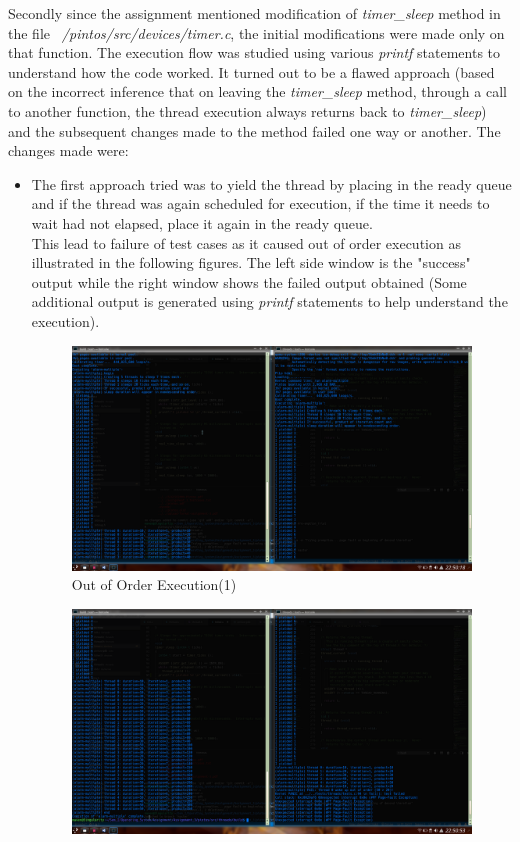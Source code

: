 \documentclass[]{article}
\begin{document}
		Secondly since the assignment mentioned modification of \textit{timer\_sleep} method in the file \textit{~/pintos/src/devices/timer.c}, the initial modifications were made only on that function. The execution flow was studied using various \textit{printf} statements to understand how the code worked. It turned out to be a flawed approach (based on the incorrect inference that on leaving the \textit{timer\_sleep} method, through a call to another function, the thread execution always returns back to \textit{timer\_sleep}) and the subsequent changes made to the method failed one way or another. The changes made were:
		\begin{itemize}
			\item The first approach tried was to yield the thread by placing in the ready queue and if the thread was again scheduled for execution, if the time it needs to wait had not elapsed, place it again in the ready queue.\\
			This lead to failure of test cases as it caused out of order execution as illustrated in the following figures. The left side window is the "success" output while the right window shows the failed output obtained (Some additional output is generated using \textit{printf} statements to help understand the execution).
			\begin{figure}[H]
				\centering
				\includegraphics[scale=0.28]{"timerOutOfOrder1"}
				\caption{Out of Order Execution(1)}
			\end{figure}
			\begin{figure}[H]
				\centering
				\includegraphics[scale=0.28]{"timerOutOfOrder2"}

\end{figure}
\end{itemize}
\end{document}
